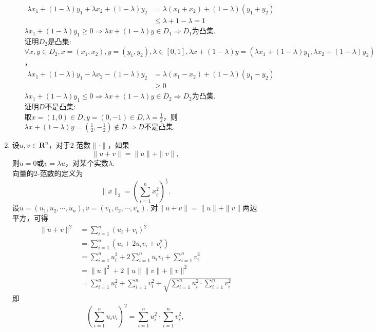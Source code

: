 \begin{enumerate}
\begin{enumerate}[label=(\arabic*)]
        \begin{align*}
            \lambda x_1 + (1-\lambda)y_1 + \lambda x_2 + (1-\lambda)y_2 & = \lambda (x_1+x_2)+(1-\lambda)(y_1+y_2)\\
            &\leqslant \lambda + 1 - \lambda =1
        \end{align*}
        $\lambda x_1 + (1-\lambda)y_1 \geqslant 0 \Rightarrow \lambda x + (1-\lambda)y \in D_1 \Rightarrow D_1$为凸集.\\
        证明$D_2$是凸集:\\$\forall x,y \in D_2, x=(x_1,x_2), y=(y_1,y_2),\lambda \in [0,1],\lambda x + (1-\lambda)y =(\lambda x_1 + (1-\lambda)y_1,\lambda x_2 + (1-\lambda)y_2)$，
        \begin{align*}
            \lambda x_1 + (1-\lambda)y_1 - \lambda x_2 - (1-\lambda)y_2 & = \lambda (x_1-x_2)+(1-\lambda)(y_1-y_2)\\
            &\geqslant 0
        \end{align*}
        $\lambda x_1 + (1-\lambda)y_1 \leqslant 0 \Rightarrow \lambda x + (1-\lambda)y \in D_2 \Rightarrow D_2$为凸集.\\
        证明$D$不是凸集:\\取$\displaystyle x=(1,0) \in D,y=(0,-1) \in D, \lambda =\frac{1}{2}$，则$\displaystyle \lambda x + (1-\lambda)y=\left(\frac{1}{2},-\frac{1}{2}\right) \not \in D \Rightarrow D$不是凸集.
    \end{enumerate}
    \item 设$u,v \in \textbf{R}^n$，对于2-范数$\| \cdot \|$，如果\[\|u+v\|=\|u\|+\|v\|,\]则$u=0$或$v=\lambda u$，对某个实数$\lambda$.\\
    \pro 向量的2-范数的定义为\[\|x\|_2=\left(\sum\limits_{i=1}^n x_i^2\right)^{\frac{1}{2}}.\]
    设$u=(u_1,u_2,\cdots,u_n),v=(v_1,v_2,\cdots,v_n)$. 对$\|u+v\|=\|u\|+\|v\|$两边平方，可得
    \begin{align*}
        \|u+v\|^2 & = \sum\limits_{i=1}^n (u_i+v_i)^2 \\
        & = \sum\limits_{i=1}^n (u_i+2u_iv_i+v_i^2) \\
        & = \sum\limits_{i=1}^n u_i^2 + 2\sum\limits_{i=1}^n u_iv_i + \sum\limits_{i=1}^n v_i^2 \\
        & = \|u\|^2 + 2\|u\|\|v\| + \|v\|^2\\
        & = \sum\limits_{i=1}^n u_i^2 + \sum\limits_{i=1}^n v_i^2 +\sqrt{\sum\limits_{i=1}^n u_i^2 \cdot \sum\limits_{i=1}^n v_i^2}
    \end{align*}
    即\[\left(\sum\limits_{i=1}^n u_iv_i\right)^2 = \sum\limits_{i=1}^n u_i^2 \cdot \sum\limits_{i=1}^n v_i^2,\]

\end{enumerate}
